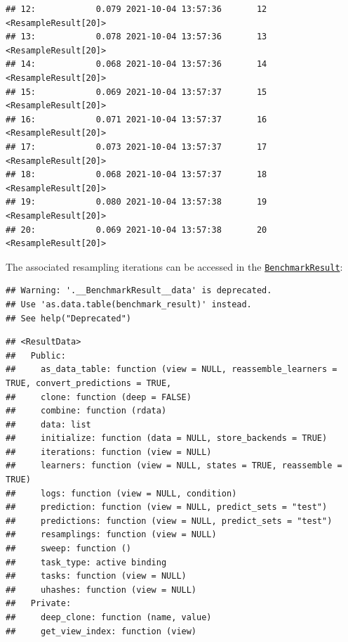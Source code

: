 \documentclass[
]{scrbook}
\newenvironment{Shaded}{\begin{snugshade}}{\end{snugshade}}
\newcommand{\NormalTok}[1]{#1}
\newcommand{\SpecialCharTok}[1]{\textcolor[rgb]{0.00,0.00,0.00}{#1}}
\renewenvironment{Shaded} {\begin{snugshade}\small} {\end{snugshade}}
\begin{document}
\begin{verbatim}
## 12:            0.079 2021-10-04 13:57:36       12 <ResampleResult[20]>
## 13:            0.078 2021-10-04 13:57:36       13 <ResampleResult[20]>
## 14:            0.068 2021-10-04 13:57:36       14 <ResampleResult[20]>
## 15:            0.069 2021-10-04 13:57:37       15 <ResampleResult[20]>
## 16:            0.071 2021-10-04 13:57:37       16 <ResampleResult[20]>
## 17:            0.073 2021-10-04 13:57:37       17 <ResampleResult[20]>
## 18:            0.068 2021-10-04 13:57:37       18 <ResampleResult[20]>
## 19:            0.080 2021-10-04 13:57:38       19 <ResampleResult[20]>
## 20:            0.069 2021-10-04 13:57:38       20 <ResampleResult[20]>
\end{verbatim}

The associated resampling iterations can be accessed in the \href{https://mlr3.mlr-org.com/reference/BenchmarkResult.html}{\texttt{BenchmarkResult}}:

\begin{Shaded}
\end{Shaded}

\begin{verbatim}
## Warning: '.__BenchmarkResult__data' is deprecated.
## Use 'as.data.table(benchmark_result)' instead.
## See help("Deprecated")
\end{verbatim}

\begin{verbatim}
## <ResultData>
##   Public:
##     as_data_table: function (view = NULL, reassemble_learners = TRUE, convert_predictions = TRUE, 
##     clone: function (deep = FALSE) 
##     combine: function (rdata) 
##     data: list
##     initialize: function (data = NULL, store_backends = TRUE) 
##     iterations: function (view = NULL) 
##     learners: function (view = NULL, states = TRUE, reassemble = TRUE) 
##     logs: function (view = NULL, condition) 
##     prediction: function (view = NULL, predict_sets = "test") 
##     predictions: function (view = NULL, predict_sets = "test") 
##     resamplings: function (view = NULL) 
##     sweep: function () 
##     task_type: active binding
##     tasks: function (view = NULL) 
##     uhashes: function (view = NULL) 
##   Private:
##     deep_clone: function (name, value) 
##     get_view_index: function (view)
\end{verbatim}
\end{document}
